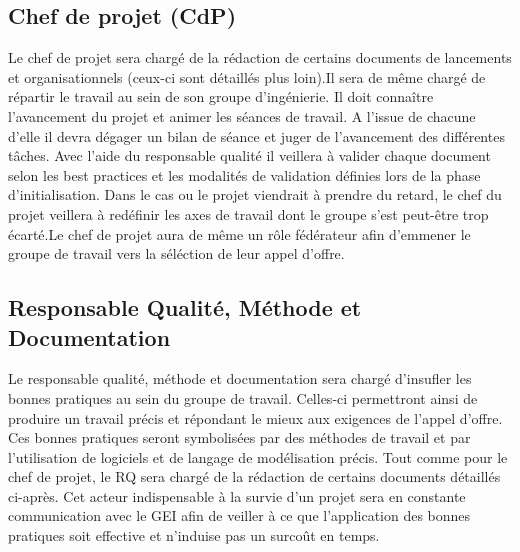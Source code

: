     
    \subsection{Chef de projet (CdP)}
Le chef de projet sera chargé de la rédaction de certains documents de lancements et organisationnels (ceux-ci sont détaillés plus loin).Il sera de même chargé de répartir le travail au sein de son groupe d'ingénierie. Il doit connaître l'avancement du projet et animer les séances de travail. A l'issue de chacune d'elle il devra dégager un bilan de séance et juger de l'avancement des différentes tâches. Avec l'aide du responsable qualité il veillera à valider chaque document selon les best practices et les modalités de validation définies lors de la phase d'initialisation. Dans le cas ou le projet viendrait à prendre du retard, le chef du projet veillera à redéfinir les axes de travail dont le groupe s'est peut-être trop écarté.Le chef de projet aura de même un rôle fédérateur afin d'emmener le groupe de travail vers la séléction de leur appel d'offre.
    \subsection{Responsable Qualité, Méthode et Documentation}
Le responsable qualité, méthode et documentation sera chargé d'insufler les bonnes pratiques au sein du groupe de travail. Celles-ci permettront ainsi de produire un travail précis et répondant le mieux aux exigences de l'appel d'offre. Ces bonnes pratiques seront symbolisées par des méthodes de travail et par l'utilisation de logiciels et de langage de modélisation précis. Tout comme pour le chef de projet, le RQ sera chargé de la rédaction de certains documents détaillés ci-après. Cet acteur indispensable à la survie d'un projet sera en constante communication avec le GEI afin de veiller à ce que l'application des bonnes pratiques soit effective et n'induise pas un surcoût en temps.
